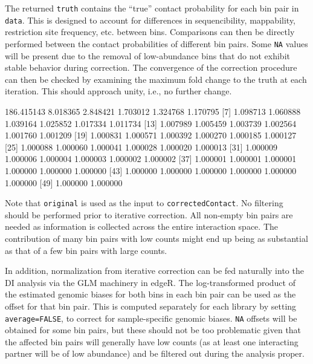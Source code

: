 \documentclass[12pt]{report}
\renewenvironment{Schunk}{\vspace{0pt}}{\vspace{0pt}}
\newcommand{\edgeR}{edgeR}
\newcommand{\code}[1]{{\small\texttt{#1}}}
\begin{document}
The returned \code{truth} contains the ``true'' contact probability for each bin pair in \code{data}.
This is designed to account for differences in sequencibility, mappability, restriction site frequency, etc. between bins.
Comparisons can then be directly performed between the contact probabilities of different bin pairs.
Some \code{NA} values will be present due to the removal of low-abundance bins that do not exhibit stable behavior during correction.
The convergence of the correction procedure can then be checked by examining the maximum fold change to the truth at each iteration.
This should approach unity, i.e., no further change.

\begin{Schunk}
\begin{Soutput}
 [1] 186.415143   8.018365   2.848421   1.703012   1.324768   1.170795
 [7]   1.098713   1.060888   1.039164   1.025852   1.017334   1.011734
[13]   1.007989   1.005459   1.003739   1.002564   1.001760   1.001209
[19]   1.000831   1.000571   1.000392   1.000270   1.000185   1.000127
[25]   1.000088   1.000060   1.000041   1.000028   1.000020   1.000013
[31]   1.000009   1.000006   1.000004   1.000003   1.000002   1.000002
[37]   1.000001   1.000001   1.000001   1.000000   1.000000   1.000000
[43]   1.000000   1.000000   1.000000   1.000000   1.000000   1.000000
[49]   1.000000   1.000000
\end{Soutput}
\end{Schunk}

Note that \code{original} is used as the input to \code{correctedContact}.
No filtering should be performed prior to iterative correction.
All non-empty bin pairs are needed as information is collected across the entire interaction space.
The contribution of many bin pairs with low counts might end up being as substantial as that of a few bin pairs with large counts.

In addition, normalization from iterative correction can be fed naturally into the DI analysis via the GLM machinery in \edgeR{}.
The log-transformed product of the estimated genomic biases for both bins in each bin pair can be used as the offset for that bin pair.
This is computed separately for each library by setting \code{average=FALSE}, to correct for sample-specific genomic biases.
\code{NA} offsets will be obtained for some bin pairs, but these should not be too problematic given that the affected bin pairs will generally have low counts (as at least one interacting partner will be of low abundance) and be filtered out during the analysis proper.
\end{document}
